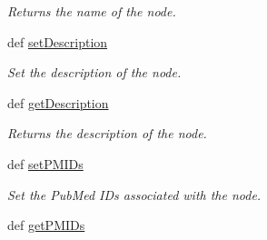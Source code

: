 \begin{DoxyCompactItemize}
\begin{DoxyCompactList}\small\item\em Returns the name of the node. \end{DoxyCompactList}\item 
def \hyperlink{classgographer_1_1_g_o_node_1_1_g_o_node_a7d0ca3ef76b7d2ea93cfaab7dc202e4f}{set\-Description}
\begin{DoxyCompactList}\small\item\em Set the description of the node. \end{DoxyCompactList}\item 
\hypertarget{classgographer_1_1_g_o_node_1_1_g_o_node_a9b05c66b0272bd0453a439fecb435845}{def \hyperlink{classgographer_1_1_g_o_node_1_1_g_o_node_a9b05c66b0272bd0453a439fecb435845}{get\-Description}}\label{classgographer_1_1_g_o_node_1_1_g_o_node_a9b05c66b0272bd0453a439fecb435845}

\begin{DoxyCompactList}\small\item\em Returns the description of the node. \end{DoxyCompactList}\item 
def \hyperlink{classgographer_1_1_g_o_node_1_1_g_o_node_acab0337312c51990cc12d8a5c3a3ef56}{set\-P\-M\-I\-Ds}
\begin{DoxyCompactList}\small\item\em Set the Pub\-Med I\-Ds associated with the node. \end{DoxyCompactList}\item 
\hypertarget{classgographer_1_1_g_o_node_1_1_g_o_node_aa5d4700b9914f7cdb00f2538b83e6b4d}{def \hyperlink{classgographer_1_1_g_o_node_1_1_g_o_node_aa5d4700b9914f7cdb00f2538b83e6b4d}{get\-P\-M\-I\-Ds}}\label{classgographer_1_1_g_o_node_1_1_g_o_node_aa5d4700b9914f7cdb00f2538b83e6b4d}


\end{DoxyCompactItemize}
